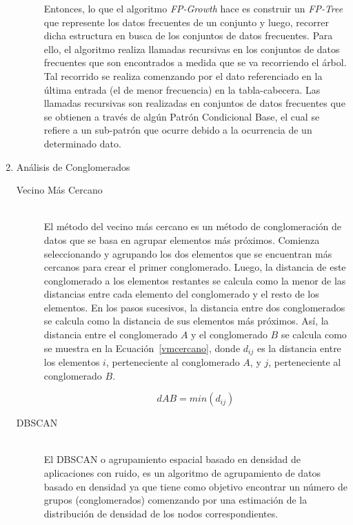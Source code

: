 \begin{enumerate}
\begin{description}
      Entonces, lo que el algoritmo \textit{FP-Growth} hace es construir un \textit{FP-Tree} que represente los datos frecuentes de un conjunto y luego, recorrer dicha estructura en busca de los conjuntos de datos frecuentes. Para ello, el algoritmo realiza llamadas recursivas en los conjuntos de datos frecuentes que son encontrados a medida que se va recorriendo el árbol. Tal recorrido se realiza comenzando por el dato referenciado en la última entrada (el de menor frecuencia) en la tabla-cabecera. Las llamadas recursivas son realizadas en conjuntos de datos frecuentes que se obtienen a través de algún Patrón Condicional Base, el cual se refiere a un sub-patrón que ocurre debido a la ocurrencia de un determinado dato.

    \end{description}
    
    
  \item Análisis de Conglomerados\cite{dataclusreview}
    \begin{description}
    
      \item[Vecino Más Cercano] \hfill \\
     El método del vecino más cercano es un método de conglomeración de datos que se basa en agrupar elementos más próximos. Comienza seleccionando y agrupando los dos elementos que se encuentran más cercanos para crear el primer conglomerado. Luego, la distancia de este conglomerado a los elementos restantes se calcula como la menor de las distancias entre cada elemento del conglomerado y el resto de los elementos. En los pasos sucesivos, la distancia entre dos conglomerados se calcula como la distancia de sus elementos más próximos. Así, la distancia entre el conglomerado $A$ y el conglomerado $B$ se calcula como se muestra en la Ecuación~\ref{vmcercano}, donde $d_{ij}$ es la distancia entre los elementos $i$, perteneciente al conglomerado $A$, y $j$, perteneciente al conglomerado $B$.
     
     \begin{equation}\label{vmcercano}
     d{AB}=min(d_{ij})
     \end{equation}
      
      \item[DBSCAN] \hfill \\
      El DBSCAN o agrupamiento espacial basado en densidad de aplicaciones con ruido, es un algoritmo de agrupamiento de datos basado en densidad ya que tiene como objetivo encontrar un número de grupos (conglomerados) comenzando por una estimación de la distribución de densidad de los nodos correspondientes. 
      

\end{description}
\end{enumerate}
